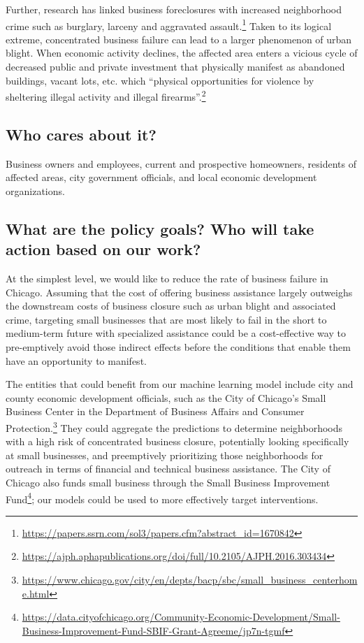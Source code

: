Further, research has linked business foreclosures with increased neighborhood crime such as burglary, larceny and aggravated assault.\footnote{\url{https://papers.ssrn.com/sol3/papers.cfm?abstract_id=1670842}} Taken to its logical extreme, concentrated business failure can lead to a larger phenomenon of urban blight. When economic activity declines, the affected area enters a vicious cycle of decreased public and private investment that physically manifest as abandoned buildings, vacant lots, etc. which “physical opportunities for violence by sheltering illegal activity and illegal firearms”.\footnote{\url{https://ajph.aphapublications.org/doi/full/10.2105/AJPH.2016.303434}}

\subsection{Who cares about it?}
Business owners and employees, current and prospective homeowners, residents of affected areas, city government officials, and local economic development organizations. 

\subsection{What are the policy goals? Who will take action based on our work?}
At the simplest level, we would like to reduce the rate of business failure in Chicago. Assuming that the cost of offering business assistance largely outweighs the downstream costs of business closure such as urban blight and associated crime, targeting small businesses that are most likely to fail in the short to medium-term future with specialized assistance could be a cost-effective way to pre-emptively avoid those indirect effects before the conditions that enable them have an opportunity to manifest. 

The entities that could benefit from our machine learning model include city and county economic development officials, such as the City of Chicago's Small Business Center in the Department of Business Affairs and Consumer Protection.\footnote{\url{https://www.chicago.gov/city/en/depts/bacp/sbc/small_business_centerhome.html}} They could aggregate the predictions to determine neighborhoods with a high risk of concentrated business closure, potentially looking specifically at small businesses, and preemptively prioritizing those neighborhoods for outreach in terms of financial and technical business assistance. The City of Chicago also funds small business through the Small Business Improvement Fund\footnote{\url{https://data.cityofchicago.org/Community-Economic-Development/Small-Business-Improvement-Fund-SBIF-Grant-Agreeme/jp7n-tgmf}}; our models could be used to more effectively target interventions.

